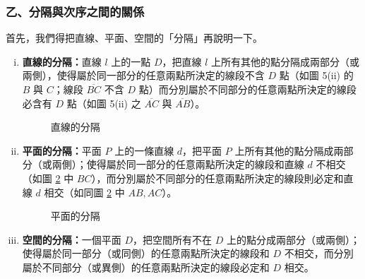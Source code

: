 \subsubsection*{乙、分隔與次序之間的關係}

首先，我們得把直線、平面、空間的「分隔」再說明一下。
\begin{enumerate}[(i), leftmargin=2.5em]
  \item \textbf{直線的分隔：}直線 $l$ 上的一點 $D$，把直線 $l$ 上所有其他的點分隔成兩部分（或兩側），使得屬於同一部分的任意兩點所決定的線段不含 $D$ 點（如圖 5(ii) 的 $B$ 與 $C$；線段 $\overline{BC}$ 不含 $D$ 點）而分別屬於不同部分的任意兩點所決定的線段必含有 $D$ 點（如圖 5(ii) 之 $\overline{AC}$ 與 $\overline{AB}$）。

  \begin{figure}[H]
  \centering
  \caption{直線的分隔}
  \label{fig:b3-a1-5-2}
  \end{figure}

  \item \textbf{平面的分隔：}平面 $P$ 上的一條直線 $d$，把平面 $P$ 上所有其他的點分隔成兩部分（或兩側）；使得屬於同一部分的任意兩點所決定的線段和直線 $d$ 不相交（如圖 \ref{fig:b3-a1-7} 中 $BC$），而分別屬於不同部分的任意兩點所決定的線段則必定和直線 $d$ 相交（如同圖 \ref{fig:b3-a1-7} 中 $AB, AC$）。

  \begin{figure}[H]
  \centering
  \caption{平面的分隔}
  \label{fig:b3-a1-7}
  \end{figure}

  \item \textbf{空間的分隔：}一個平面 $D$，把空間所有不在 $D$ 上的點分成兩部分（或兩側）；使得屬於同一部分（或同側）的任意兩點所決定的線段和 $D$ 不相交，而分別屬於不同部分（或異側）的任意兩點所決定的線段必定和 $D$ 相交。


\end{enumerate}
